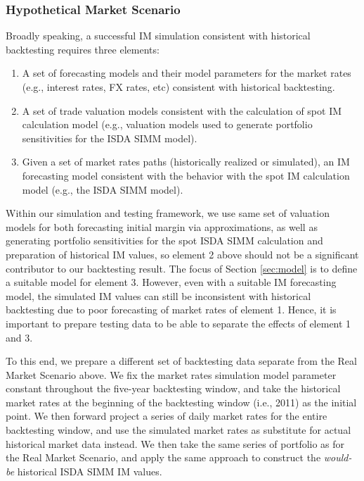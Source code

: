 \documentclass[preprint,12pt]{elsarticle}
\begin{document}
\subsubsection{Hypothetical Market Scenario}
Broadly speaking, a successful IM simulation consistent with historical backtesting requires three elements:
\begin{enumerate}
\item A set of forecasting models and their model parameters for the market rates (e.g., interest rates, FX rates, etc) consistent with historical backtesting. 
\item A set of trade valuation models consistent with the calculation of spot IM calculation model (e.g., valuation models used to generate portfolio sensitivities for the ISDA SIMM model).
\item Given a set of market rates paths (historically realized or simulated), an IM forecasting model consistent with the behavior with the spot IM calculation model (e.g., the ISDA SIMM model).
\end{enumerate}

Within our simulation and testing framework, we use same set of valuation models for both forecasting initial margin via approximations, as well as generating portfolio sensitivities for the spot ISDA SIMM calculation and preparation of historical IM values, so element 2 above should not be a significant contributor to our backtesting result. The focus of Section \ref{sec:model} is to define a suitable model for element 3. However, even with a suitable IM forecasting model, the simulated IM values can still be inconsistent with historical backtesting due to poor forecasting of market rates of element 1. Hence, it is important to prepare testing data to be able to separate the effects of element 1 and 3. 

To this end, we prepare a different set of backtesting data separate from the Real Market Scenario above. We fix the market rates simulation model parameter constant throughout the five-year backtesting window, and take the historical market rates at the beginning of the backtesting window (i.e., 2011) as the initial point. We then forward project a series of daily market rates for the entire backtesting window, and use the simulated market rates as substitute for actual historical market data instead. We then take the same series of portfolio as for the Real Market Scenario, and apply the same approach to construct the \emph{would-be} historical ISDA SIMM IM values. 
\end{document}
